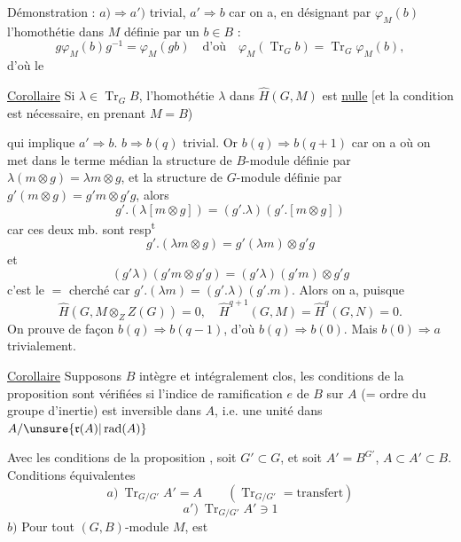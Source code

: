 Démonstration : $a)\Rightarrow a')$ trivial, $a'\Rightarrow b$ car on a, en désignant par $\varphi_M(b)$ l'homothétie dans $M$ définie par un $b\in B$ :
\[
g\varphi_M(b)g^{-1}=\varphi_M(gb)\quad\text{d'où}\quad\varphi_M(\operatorname{Tr}_G b)=\operatorname{Tr}_G\varphi_M(b),
\]
d'où le

\uline{Corollaire} Si $\lambda\in\operatorname{Tr}_G B$, l'homothétie $\lambda$ dans $\widehat H(G,M)$ est \uline{nulle}
[et la condition est  nécessaire, en prenant $M=B$)

qui implique $a'\Rightarrow b$. $b\Rightarrow b(q)$ trivial. Or $b(q)\Rightarrow b(q+1)$ car on a
où on met dans le terme médian la  structure de $B$-module définie par $\lambda(m\otimes g)=\lambda m\otimes g$, et la structure de $G$-module définie par $g'(m\otimes g)=g'm\otimes g'g$, alors
\[
g'.(\lambda[m\otimes g])=(g'.\lambda)(g'.[m\otimes g])
\]
car ces deux mb. sont resp\textsuperscript{t}
\[
g'.(\lambda m\otimes g)=g'(\lambda m)\otimes g'g
\]
et
\[
(g'\lambda)(g'm\otimes g'g)=(g'\lambda)(g'm)\otimes g'g
\]
c'est le $=$ cherché car $g'.(\lambda m)=(g'.\lambda)(g'.m)$. Alors on a, puisque
\[
\widehat H(G,M\otimes_Z Z(G))=0,\quad\widehat H^{q+1}(G,M)=\widehat H^q(G,N)=0.
\]
On prouve de façon  $b(q)\Rightarrow b(q-1)$, d'où $b(q)\Rightarrow b(0)$. Mais $b(0)\Rightarrow a$ trivialement.

\uline{Corollaire} Supposons $B$  intègre et intégralement clos,  les conditions de la proposition sont vérifiées si l'indice de ramification $e$ de $B$ sur $A$ (= ordre du groupe d'inertie)  est inversible dans $A$, i.e. une unité dans $A/\unsure{\mathfrak r(A)|\operatorname{rad}(A)}$ 


Avec les conditions de la proposition , soit $G'\subset G$, et soit $A'=B^{G'}$, $A\subset A'\subset B$. Conditions équivalentes
\[
a)\ \operatorname{Tr}_{G/G'}A'=A\qquad(\operatorname{Tr}_{G/G'}=\text{transfert})
\]
\[
a')\ \operatorname{Tr}_{G/G'}A'\ni1
\]
$b)$ Pour tout $(G,B)$-module $M$,
est  

